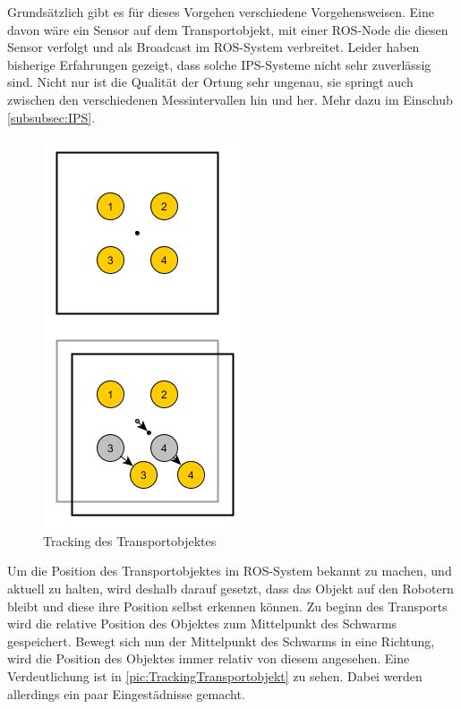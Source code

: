 Grundsätzlich gibt es für dieses Vorgehen verschiedene Vorgehensweisen. Eine davon wäre ein Sensor auf dem Transportobjekt, mit einer ROS-Node die diesen Sensor verfolgt und als Broadcast im ROS-System verbreitet. Leider haben bisherige Erfahrungen gezeigt, dass solche IPS-Systeme nicht sehr zuverlässig sind. Nicht nur ist die Qualität der Ortung sehr ungenau, sie springt auch zwischen den verschiedenen Messintervallen hin und her. Mehr dazu im Einschub \autoref{subsubsec:IPS}.

\begin{figure}
	\includegraphics[width=\pictureWidthSmall,keepaspectratio]{graphics/Transport/Tracking.png}
	\caption{Tracking des Transportobjektes}
	\label{pic:TrackingTransportobjekt}
\end{figure}

Um die Position des Transportobjektes im ROS-System bekannt zu machen, und aktuell zu halten, wird deshalb darauf gesetzt, dass das Objekt auf den Robotern bleibt und diese ihre Position selbst erkennen können. Zu beginn des Transports wird die relative Position des Objektes zum Mittelpunkt des Schwarms gespeichert. Bewegt sich nun der Mittelpunkt des Schwarms in eine Richtung, wird die Position des Objektes immer relativ von diesem angesehen. Eine Verdeutlichung ist in \autoref{pic:TrackingTransportobjekt} zu sehen. Dabei werden allerdings ein paar Eingestädnisse gemacht.


